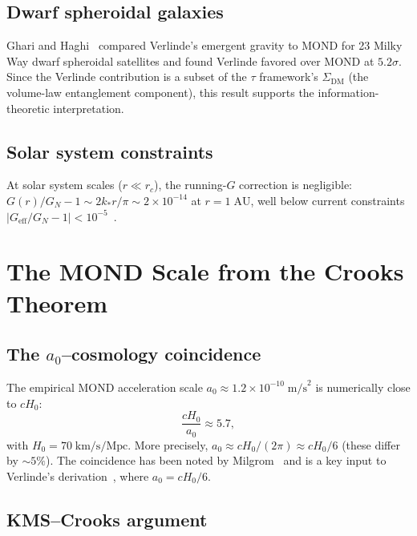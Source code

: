 \documentclass[prd,twocolumn,superscriptaddress,longbibliography,floatfix]{revtex4-2}
\newcommand{\tauasym}{\tau}
\begin{document}
\subsection{Dwarf spheroidal galaxies}

Ghari and Haghi~\cite{GhariHaghi2026} compared Verlinde's
emergent gravity to MOND for 23 Milky Way dwarf spheroidal
satellites and found Verlinde favored over MOND at
$5.2\sigma$.  Since the Verlinde contribution is a subset
of the $\tauasym$ framework's $\Sigma_{\mathrm{DM}}$ (the
volume-law entanglement component), this result supports the
information-theoretic interpretation.

\subsection{Solar system constraints}

At solar system scales ($r \ll r_c$), the running-$G$
correction is negligible: $G(r)/G_N - 1 \sim 2k_* r/\pi
\sim 2 \times 10^{-14}$ at $r = 1\;\mathrm{AU}$, well
below current constraints
$|G_{\mathrm{eff}}/G_N - 1| < 10^{-5}$~\cite{Will2014}.

\section{The MOND Scale from the Crooks Theorem}
\label{sec:a0}

\subsection{The $a_0$--cosmology coincidence}

The empirical MOND acceleration scale
$a_0 \approx 1.2 \times 10^{-10}\;\mathrm{m/s}^2$ is
numerically close to $cH_0$:
\begin{equation}
\frac{cH_0}{a_0} \approx 5.7,
\end{equation}
with $H_0 = 70\;\mathrm{km/s/Mpc}$.  More precisely,
$a_0 \approx cH_0/(2\pi) \approx cH_0/6$
(these differ by $\sim\!5\%$).  The coincidence has been
noted by Milgrom~\cite{Milgrom2020} and is a key input to
Verlinde's derivation~\cite{Verlinde2016}, where
$a_0 = cH_0/6$.

\subsection{KMS--Crooks argument}
\end{document}
